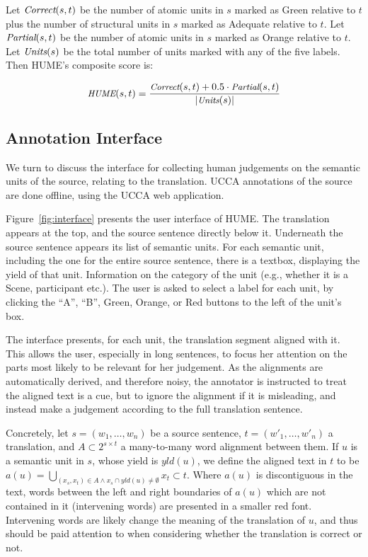 \documentclass[11pt]{article}
\newcommand{\figref}[1]{Figure~\ref{#1}}
\def\setsize#1{\lvert #1 \rvert}
\def\func#1{\text{\it #1}}  %
\def\HUME{\func{HUME}}
\def\Correct{\func{Correct}}
\def\Partial{\func{Partial}}
\def\Units{\func{Units}}
\begin{document}
Let $\Correct(s,t)$ be the number of atomic units in $s$ marked as Green relative to $t$ plus
the number of structural units in $s$ marked as Adequate relative to $t$.
Let $\Partial(s,t)$ be the number of atomic units in $s$ marked as Orange relative
to $t$. Let $\Units(s)$ be the total number of units marked with any of the five labels.
Then HUME's composite score is:

\vspace{-.5cm}
\begin{equation}
  \small
  \HUME(s,t) = \frac{\Correct(s,t) + 0.5\cdot \Partial(s,t)}{\setsize{\Units(s)}}
  \nonumber
\end{equation}



\subsection{Annotation Interface}

We turn to discuss the interface for collecting human judgements on the semantic units
of the source, relating to the translation. UCCA annotations of the source are done offline,
using the UCCA web application.

\figref{fig:interface} presents the user interface of HUME. 
The translation appears at the top, and
the source sentence directly below it. Underneath the source sentence appears
its list of semantic units. For each semantic unit, including the one for the
entire source sentence, there is a textbox, displaying the yield of that unit.
Information on the category of the unit (e.g., whether it is a Scene, participant etc.).
The user is asked to select a label for each unit,
by clicking the ``A'', ``B'', Green, Orange, or Red buttons to the left of the unit's box.

The interface presents, for each unit, the translation segment aligned with it.
This allows the user, especially in long sentences, to focus her attention on the parts
most likely to be relevant for her judgement. As the alignments are automatically derived,
and therefore noisy, the annotator is instructed to treat the aligned text is a cue, but to ignore
the alignment if it is misleading, and instead 
make a judgement according to the full translation sentence.

Concretely, let $s = (w_1,\ldots,w_n)$ be a source sentence, $t = (w'_1,\ldots,w'_n)$ a translation,
and $A \subset 2^{s \times t}$ a many-to-many word alignment between them.
If $u$ is a semantic unit in $s$, whose yield is $yld(u)$, we define the aligned text in
$t$ to be $a(u)=\bigcup_{(x_s,x_t) \in A \wedge x_s \cap yld(u) \neq \emptyset} x_t \subset t$.
Where $a(u)$ is discontiguous in the text, words between the left
and right boundaries of $a(u)$ which are not contained in it (intervening words)
are presented in a smaller red font.
Intervening words are likely change the meaning of the translation
of $u$, and thus should be paid attention to when considering whether the translation
is correct or not.
\end{document}
